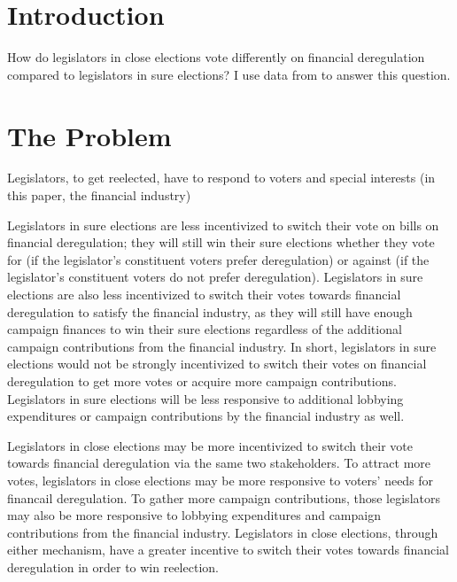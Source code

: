 \documentclass[ProjectKWK]{subfiles}
\begin{document}
{\titlepagefinish}

\hypertarget{Introduction}{}
\section{Introduction}\label{sec:intro}





How do legislators in close elections vote differently on financial deregulation compared to legislators in sure elections? I use data from \cite{IM14} to answer this question.


\hypertarget{The-Problem}{}

\section{The Problem}

Legislators, to get reelected, have to respond to voters and special interests (in this paper, the financial industry)

Legislators in sure elections are less incentivized to switch their vote on bills on financial deregulation; they will still win their sure elections whether they vote for (if the legislator's constituent voters prefer deregulation) or against (if the legislator's constituent voters do not prefer deregulation). Legislators in sure elections are also less incentivized to switch their votes towards financial deregulation to satisfy the financial industry, as they will still have enough campaign finances to win their sure elections regardless of the additional campaign contributions from the financial industry. In short, legislators in sure elections would not be strongly incentivized to switch their votes on financial deregulation to get more votes or acquire more campaign contributions. Legislators in sure elections will be less responsive to additional lobbying expenditures or campaign contributions by the financial industry as well.

Legislators in close elections may be more incentivized to switch their vote towards financial deregulation via the same two stakeholders. To attract more votes, legislators in close elections may be more responsive to voters' needs for financail deregulation. To gather more campaign contributions, those legislators may also be more responsive to lobbying expenditures and campaign contributions from the financial industry. Legislators in close elections, through either mechanism, have a greater incentive to switch their votes towards financial deregulation in order to win reelection.
\end{document}
